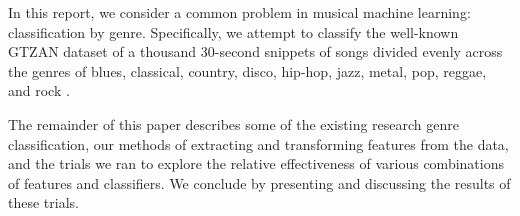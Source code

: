 In this report, we consider a common problem in musical machine learning: classification by genre. Specifically, we attempt to classify the well-known GTZAN dataset of a thousand 30-second snippets of songs divided evenly across the genres of blues, classical, country, disco, hip-hop, jazz, metal, pop, reggae, and rock \cite{scikit-learn}.

The remainder of this paper describes some of the existing research genre classification, our methods of extracting and transforming features from the data, and the trials we ran to explore the relative effectiveness of various combinations of features and classifiers. We conclude by presenting and discussing the results of these trials.